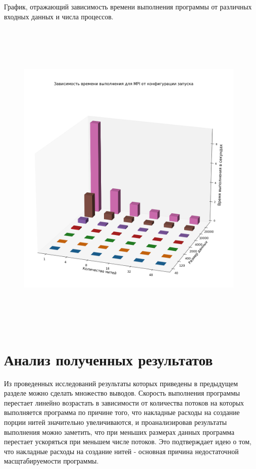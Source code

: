\documentclass{article}
\begin{document}
График, отражающий зависимость времени выполнения программы от различных входных данных и числа процессов.

\begin{figure}[H]
    \centering
    \includegraphics[scale = 0.4,width=16cm,height=16cm]{mpi_plot.png}
\end{figure}

\section{Анализ полученных результатов}

Из проведенных исследований результаты которых приведены в предыдущем
разделе можно сделать множество выводов.
Скорость выполнения программы перестает линейно возрастать в зависимости
от количества потоков на которых выполняется программа по причине того, что
накладные расходы на создание порции нитей значительно увеличиваются, и
проанализировав результаты выполнения можно заметить, что при меньших размерах данных программа перестает ускоряться при меньшем числе потоков. Это
подтверждает идею о том, что накладные расходы на создание нитей - основная
причина недостаточной масщтабируемости программы.
\end{document}
